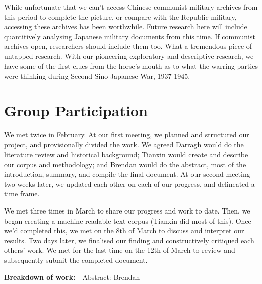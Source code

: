\documentclass[12pt,letterpaper]{article}
\begin{document}
\begin{CJK*}{UTF8}{gbsn}
		\vspace{.35cm}
		
		\noindent While unfortunate that we can’t access Chinese communist military archives from this period to complete the picture, or compare with the Republic military, accessing these archives has been worthwhile. Future research here will include quantitively analysing Japanese military documents from this time. If communist archives open, researchers should include them too. What a tremendous piece of untapped research. With our pioneering exploratory and descriptive research, we have some of the first clues from the horse’s mouth as to what the warring parties were thinking during Second Sino-Japanese War, 1937-1945.
		\vspace{.5cm}
		\maketitle
		\section*{Group Participation}
		\vspace{.1cm}
		We met twice in February. At our first meeting, we planned and structured our project, and provisionally divided the work. We agreed Darragh would do the literature review and historical background; Tianxin would create and describe our corpus and methodology; and Brendan would do the abstract, most of the introduction, summary, and compile the final document. At our second meeting two weeks later, we updated each other on each of our progress, and delineated a time frame. 
		
		\vspace{.35cm}
		
		We met three times in March to share our progress and work to date. Then, we began creating a machine readable text corpus (Tianxin did most of this). Once we’d completed this, we met on the 8th of March to discuss and interpret our results. Two days later, we finalised our finding and constructively critiqued each others’ work. We met for the last time on the 12th of March to review and subsequently submit the completed document.
		
		\vspace{.35cm}
		
		\noindent\textbf{Breakdown of work:}
		\vspace{.1cm}
		\noindent - Abstract: Brendan
		
		\vspace{.1cm}
		

\end{CJK*}
\end{document}
